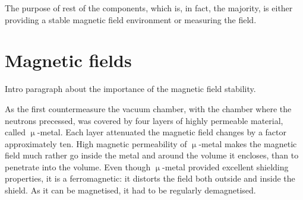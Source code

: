 The purpose of rest of the components, which is, in fact, the majority, is either providing a stable magnetic field environment or measuring the field.


\section{Magnetic fields}

Intro paragraph about the importance of the magnetic field stability.

As the first countermeasure the vacuum chamber, with the chamber where the neutrons precessed, was covered by four layers of highly permeable material, called $\upmu$-metal. Each layer attenuated the magnetic field changes by a factor approximately ten. High magnetic permeability of $\upmu$-metal makes the magnetic field much rather go inside the metal and around the volume it encloses, than to penetrate into the volume. Even though $\upmu$-metal provided excellent shielding properties, it is a ferromagnetic: it distorts the field both outside and inside the shield. As it can be magnetised, it had to be regularly demagnetised.

